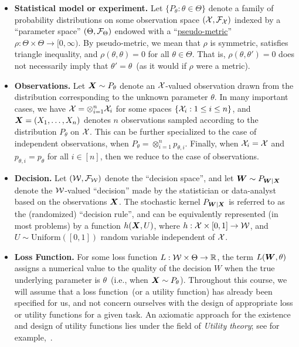 \documentclass[12pt]{article}
\begin{document}
\begin{itemize}
	\item \textbf{Statistical model or experiment.}  Let $\{P_\theta: \theta \in \Theta\}$ denote a family of probability distributions on some observation space $({\cal X}, {\cal F}_{\cal X})$ indexed by a ``parameter space'' $(\Theta, {\cal F}_\Theta)$ endowed with a ``\href{https://en.wikipedia.org/wiki/Metric_space#Pseudometrics}{pseudo-metric}'' $\rho:\Theta \times \Theta \to [0, \infty)$. By pseudo-metric, we mean that $\rho$ is symmetric, satisfies triangle inequality, and $\rho(\theta, \theta)=0$ for all $\theta \in \Theta$. That is, $\rho(\theta, \theta')=0$ does not necessarily imply that $\theta'=\theta$~(as it would if $\rho$ were a metric). 

	\item \textbf{Observations.} Let ${\boldsymbol X} \sim P_\theta$ denote an ${\cal X}$-valued observation drawn from the distribution corresponding to the unknown parameter $\theta$. In many important cases, we have ${\cal X} = \otimes_{i=1}^n {\cal X}_i$ for some spaces $\{{\cal X}_i: 1 \leq i \leq n\}$, and ${\boldsymbol X} = (X_1, \ldots, X_n)$ denotes $n$ observations sampled according to the distribution $P_\theta$ on ${\cal X}$.  This can be further specialized to the case of independent observations, when $P_\theta = \otimes_{i=1}^n p_{\theta, i}$. Finally, when ${\cal X}_i = {\cal X}$ and $p_{\theta, i} = p_\theta$ for all $i \in [n]$, then we reduce to the case of \iid observations. 


	\item \textbf{Decision.} Let $({\cal W}, {\cal F}_{\cal W})$ denote the ``decision space'', and let ${\boldsymbol W} \sim P_{{\boldsymbol W}|{\boldsymbol X}}$  denote the ${\cal W}$-valued ``decision'' made by the statistician or data-analyst based on the observations ${\boldsymbol X}$. The stochastic kernel $P_{{\boldsymbol W}|{\boldsymbol X}}$ is referred to as the (randomized) ``decision rule'', and can be equivalently represented (in most problems) by a function $h({\boldsymbol X}, U)$, where $h:{\cal X} \times [0,1] \to {\cal W}$, and $U \sim \mathrm{Uniform}([0,1])$ random variable independent of ${\cal X}$.

	\item \textbf{Loss Function.} For some loss function  $L:{\cal W} \times \Theta \to \mathbb{R}$, the term $L({\boldsymbol W}, \theta)$  assigns a numerical value to the quality of the decision $W$ when the true underlying parameter is $\theta$~(i.e., when ${\boldsymbol X} \sim P_\theta$). Throughout this course, we will assume that a loss function~(or a utility function) has already been specified for us, and not concern ourselves with the design of appropriate loss or utility functions for a given task. An axiomatic approach for the existence and design of utility functions lies under the field of \emph{Utility theory}; see for example,~\citet{bernardo2009bayesian}. 
\end{itemize}
\end{document}
